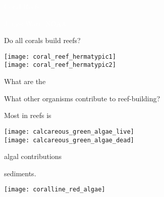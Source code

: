 \documentclass[t,handout]{beamer}  %
\begin{document}

{
\begin{frame}[b]{\hfill\textcolor{white}{Coral Reefs}}

\tiny\hfill\textcolor{white}{James Watt, NOAA}
\end{frame}
}

\begin{frame}[t]{Do all  corals build reefs?}
\begin{multicols}{2}

\begin{center}
\texttt{[image: coral\_reef\_hermatypic1]} \\[1ex]

\texttt{[image: coral\_reef\_hermatypic2]} 
\end{center}

\columnbreak

	\hangpara What are the 
	
	\hangpara What other organisms contribute to reef-building?


\end{multicols}

\end{frame}


\begin{frame}[t]{Most  in reefs is }
\begin{multicols}{2}

\begin{center}
\texttt{[image: calcareous\_green\_algae\_live]} \\[1ex]

\texttt{[image: calcareous\_green\_algae\_dead]} 
\end{center}

\columnbreak

	\hangpara algal contributions
	
	\hangpara sediments.
	
	\vspace*{5\baselineskip}

	\texttt{[image: coralline\_red\_algae]} 

\end{multicols}

\end{frame}
\end{document}
